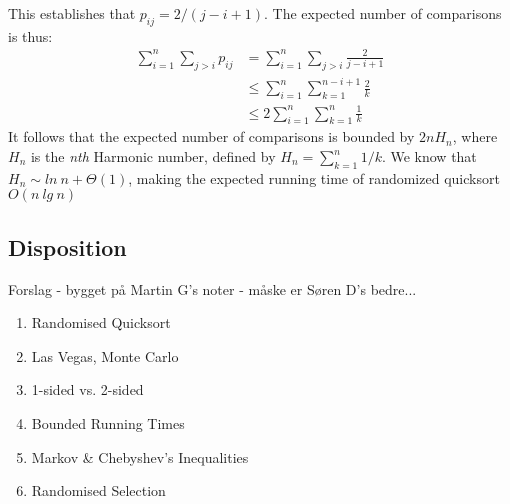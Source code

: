 This establishes that $p_{ij} = 2/(j - i + 1)$. The expected number of comparisons is thus:
%
\begin{align*}
	\sum_{i=1}^n \sum_{j>i} p_{ij} &= \sum_{i=1}^n \sum_{j>i} \frac{2}{j-i+1} \\
	&\leq \sum_{i=1}^n \sum_{k=1}^{n-i+1} \frac{2}{k} \\
	&\leq 2\sum_{i=1}^n \sum_{k=1}^{n} \frac{1}{k}
\end{align*}
%
It follows that the expected number of comparisons is bounded by $2nH_n$, where $H_n$ is the \textit{nth}
Harmonic number, defined by $H_n = \sum_{k=1}^n 1/k$. We know that $H_n \sim ln\ n + \Theta(1)$, making the
expected running time of randomized quicksort $O(n\ lg\ n)$


\subsection{Disposition}
Forslag - bygget på Martin G's noter - måske er Søren D's bedre...

\begin{enumerate}
	\item Randomised Quicksort
	\item Las Vegas, Monte Carlo
	\item 1-sided vs. 2-sided
	\item Bounded Running Times
	\item Markov \& Chebyshev's Inequalities
	\item Randomised Selection
\end{enumerate}